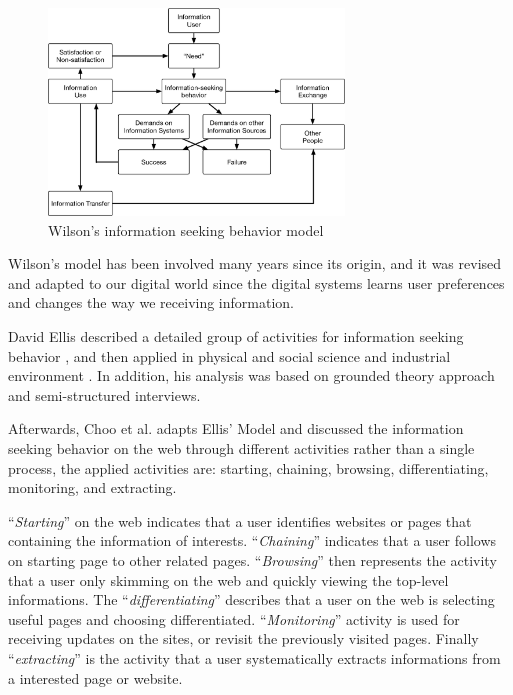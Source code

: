 \begin{figure}
    \centering
    \includegraphics[width=0.7\textwidth]{figures/wilson-info-behavior}
    \caption{Wilson's information seeking behavior model \cite{wilson1981user}}
    \label{fig:wilson-info-seek}
\end{figure}

Wilson's model has been involved many years since its origin, and it was revised 
and adapted to our digital world since the digital systems learns user preferences and 
changes \cite{giannini1998receiving} the way we receiving information.

David Ellis described a detailed group of activities for information seeking behavior \cite{ellis1989behavioural},
and then applied in physical and social science \cite{ellis1993comparison} and industrial
environment \cite{ellis1997modelling}.
In addition, his analysis was
based on grounded theory approach \cite{aceto1994grounded} and semi-structured interviews. 

Afterwards, Choo et al. adapts Ellis' Model and discussed \cite{choo1999information}
the information seeking behavior on the web through different activities rather than 
a single process, the applied activities are:
starting, chaining, browsing, differentiating, monitoring, and extracting.

``\emph{Starting}'' on the web indicates that a user identifies websites or pages
that containing the information of interests.
``\emph{Chaining}'' indicates that a user follows on starting page to other related pages.
``\emph{Browsing}'' then represents the activity that a user only skimming on the web
and quickly viewing the top-level informations. The ``\emph{differentiating}'' 
describes that a user on the web is selecting useful pages and choosing differentiated.
``\emph{Monitoring}'' activity is used for receiving updates on the sites, or revisit
the previously visited pages. Finally ``\emph{extracting}'' is the activity that a user
systematically extracts informations from a interested page or website.

